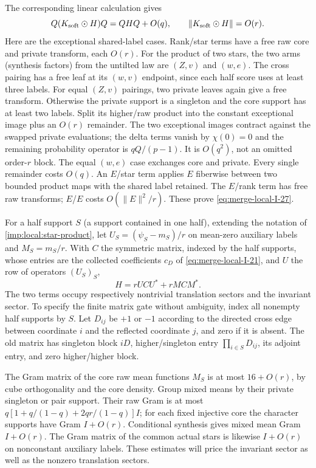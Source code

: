 The corresponding linear calculation gives
\begin{equation}\label{eq:merge-local-I-27}
 Q(K_{\rm soft}\odot H)Q=QHQ+O(q),\qquad
 \|K_{\rm soft}\odot H\|=O(r).
\end{equation}
Here are the exceptional shared-label cases. Rank/star terms
have a free raw core and private transform, each $O(r)$.
For the product of two stars, the two arms (synthesis factors)
from the untilted law are $(Z,v)$ and $(w,e)$.
The cross pairing has a free leaf at its $(w,v)$ endpoint,
since each half score uses at least three labels.
For equal $(Z,v)$ pairings, two private leaves again give a free
transform. Otherwise the private support is a singleton and
the core support has at least two labels. Split its higher/raw
product into the constant exceptional image plus an $O(r)$
remainder. The two exceptional images contract against the
swapped private evaluations; the delta terms vanish by
$\chi(0)=0$ and the remaining probability operator is
$qQ/(p-1)$. It is $O(q^2)$, not an omitted order-$r$ block.
The equal $(w,e)$ case exchanges core and private. Every
single remainder costs $O(q)$. An $E$/star term applies $E$
fiberwise between two bounded product maps with the shared
label retained. The $E$/rank term has free raw transforms;
$E$/$E$ costs $O(\|E\|^2/r)$. These prove \eqref{eq:merge-local-I-27}.

For a half support $S$ (a support contained in one half), extending the notation of \cref{imp:local:star-product}, let
$U_S=(\psi_S-m_S)/r$ on
mean-zero auxiliary labels and $M_S=m_S/r$. With $C$ the
symmetric matrix, indexed by the half supports, whose entries
are the collected coefficients $c_D$ of
\eqref{eq:merge-local-I-21}, and $U$ the row of operators
$(U_S)_S$,
\begin{equation}\label{eq:merge-local-I-28}
 H=rUCU^*+rMCM^* .
\end{equation}
The two terms occupy respectively nontrivial translation sectors
and the invariant sector. To specify the finite matrix gate
without ambiguity, index all nonempty half supports by $S$.
Let $D_{ij}$ be $+1$ or $-1$ according to the directed cross
edge between coordinate $i$ and the reflected coordinate $j$,
and zero if it is absent. The old matrix has singleton block
$iD$, higher/singleton entry $\prod_{i\in S}D_{ij}$, its
adjoint entry, and zero higher/higher block.

The Gram matrix of the core raw mean functions $M_S$ is at most $16+O(r)$, by cube orthogonality
and the core density. Group mixed means by their private singleton
or pair support. Their raw Gram is at most
$q[1+q/(1-q)+2qr/(1-q)]I$; for each fixed injective core the
character supports have Gram $I+O(r)$. Conditional synthesis gives
mixed mean Gram $I+O(r)$. The Gram matrix of the common actual stars is likewise
$I+O(r)$ on nonconstant auxiliary labels. These estimates will price
the invariant sector as well as the nonzero translation sectors.

